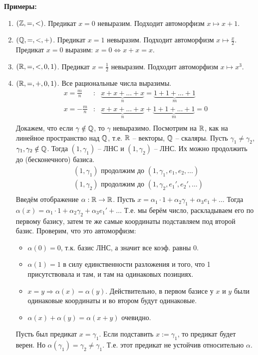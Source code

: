 \textbf{Примеры:}
\begin{enumerate}
    \item $(\mathbb{Z}, =, <)$. Предикат $x = 0$ невыразим. Подходит автоморфизм $x \mapsto x + 1$.
    \item $(\mathbb{Q}, =, <, +)$. Предикат $x = 1$ невыразим. Подходит автоморфизм $x \mapsto \frac{x}{2}$. \\
    Предикат $x = 0$ выразим: $x = 0 \Leftrightarrow x + x = x$.
    \item $(\mathbb{R}, =, <, 0, 1)$. Предикат $x = \frac{1}{2}$ невыразим. Подходит автоморфизм $x \mapsto x^3$. 
    \item $(\mathbb{R}, =, +, 0, 1)$. Все рациональные числа выразимы.
    \begin{align*}
        x=\frac{m}{n} &:  &\underbrace{x+x+...+x}_{n} = \underbrace{1+1+...+1}_{m} \\
        x=-\frac{m}{n} &:  &\underbrace{x+x+...+x}_{n} + \underbrace{1+1+...+1}_{m} = 0\\
    \end{align*}
    Докажем, что если $\gamma \notin \mathbb{Q}$, то $\gamma$ невыразимо. Посмотрим на $\mathbb{R}$, как на линейное пространство над $\mathbb{Q}$, т.е. $\mathbb{R}$ -- векторы, $\mathbb{Q}$ -- скаляры. Пусть $\gamma_1 \neq \gamma_2$, $\gamma_1, \gamma_2 \notin \mathbb{Q}$. Тогда $(1, \gamma_1)$ -- ЛНС и $(1, \gamma_2)$ -- ЛНС. Их можно продолжить до (бесконечного) базиса.
    \begin{align*}
        & (1, \gamma_1) \text{  продолжим до  } (1, \gamma_1, e_1, e_2, \dots) \\
        & (1, \gamma_2) \text{  продолжим до  } (1, \gamma_2, e_1', e_2', \dots) \\
    \end{align*}
    Введём отображение $\alpha : \mathbb{R} \to \mathbb{R}$. Пусть $x = \alpha_1 \cdot 1 + \alpha_2 \gamma_1 + \alpha_3 e_1 + \dots$ Тогда $\alpha(x) = \alpha_1 \cdot 1 + \alpha_2 \gamma_2 + \alpha_3 e_1' + \dots$ Т.е. мы берём число, раскладываем его по первому базису, затем те же самые координаты подставляем под второй базис. Проверим, что это автоморфизм:
    \begin{itemize}
        \item $\alpha(0) = 0$, т.к. базис ЛНС, а значит все коэф. равны 0.
        \item $\alpha(1) = 1$ в силу единственности разложения и того, что 1 присутствовала и там, и там на одинаковых позициях.
        \item $x = y \Rightarrow \alpha(x) = \alpha(y)$. Действительно,
        в первом базисе у $x$ и $y$ были одинаковые координаты и во втором будут одинаковые.
        \item $\alpha(x) + \alpha(y) = \alpha(x + y)$ очевидно.
    \end{itemize}
    Пусть был предикат $x = \gamma_1$. Если подставить $x := \gamma_1$, то предикат будет верен. Но $\alpha(\gamma_1) = \gamma_2 \neq \gamma_1$. Т.е. этот предикат не устойчив относительно $\alpha$.
\end{enumerate} 

